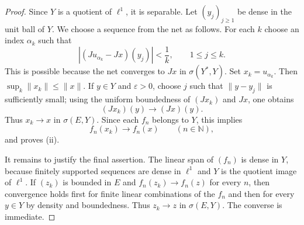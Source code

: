 \documentclass[10pt,a4paper]{amsart}
\newcommand{\N}{\mathbb N}
\begin{document}
\begin{proof}
Since $Y$ is a quotient of $\ell^1$, it is separable. Let $(y_j)_{j\ge1}$
be dense in the unit ball of $Y$. We choose a sequence from the net as
follows. For each $k$ choose an index $\alpha_k$ such that
\[
        |(Ju_{\alpha_k}-Jx)(y_j)|<\frac1k,
        \qquad 1\le j\le k.
\]
This is possible because the net converges to $Jx$ in $\sigma(Y^*,Y)$.
Set $x_k=u_{\alpha_k}$. Then $\sup_k\|x_k\|\le\|x\|$. If $y\in Y$ and
$\varepsilon>0$, choose $j$ such that $\|y-y_j\|$ is sufficiently small;
using the uniform boundedness of $(Jx_k)$ and $Jx$, one obtains
\[
        (Jx_k)(y)\longrightarrow (Jx)(y).
\]
Thus $x_k\to x$ in $\sigma(E,Y)$. Since each $f_n$ belongs to $Y$, this
implies
\[
        f_n(x_k)\longrightarrow f_n(x)\qquad(n\in\N),
\]
and proves \textup{(ii)}.

It remains to justify the final assertion. The linear span of $(f_n)$ is
dense in $Y$, because finitely supported sequences are dense in $\ell^1$ and
$Y$ is the quotient image of $\ell^1$. If $(z_k)$ is bounded in $E$ and
$f_n(z_k)\to f_n(z)$ for every $n$, then convergence holds first for finite
linear combinations of the $f_n$ and then for every $y\in Y$ by density and
boundedness. Thus $z_k\to z$ in $\sigma(E,Y)$. The converse is immediate.
\end{proof}
\end{document}
